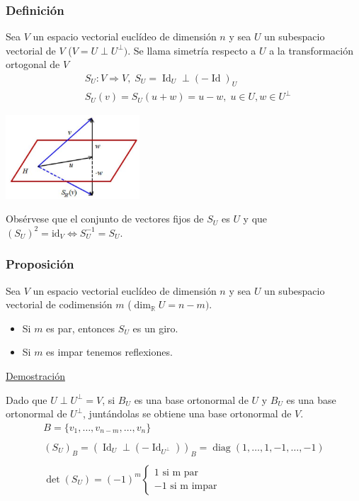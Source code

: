 \documentclass[12pt, a4paper, ones, notitlepage, openany,titlepage]{article}
\begin{document}
\subsubsection{Definición}
Sea $V$ un espacio vectorial euclídeo de dimensión $n$ y sea $U$ un subespacio vectorial de $V$ ($V = U \perp U^\perp)$. Se llama simetría respecto a $U$ a la transformación ortogonal de $V$
$$
\begin{aligned}
	& S_U : V \Longrightarrow V, \; S_U = \operatorname{Id}_U \perp(-\operatorname{Id})_U \\
	& S_U(v) = S_U(u + w) = u - w, \; u \in U, w \in U^\perp
\end{aligned}
$$
\begin{center}
	\includegraphics[max width=5cm]{2023_03_20_c2fe6c117849a1a0e8afg-053}
\end{center}
Obsérvese que el conjunto de vectores fijos de $S_{U}$ es $U$ y que $\left(S_{U}\right)^{2}=\mathrm{id}_{V} \Longleftrightarrow S_{U}^{-1}=S_{U}$.

\subsubsection{Proposición}
Sea $V$ un espacio vectorial euclídeo de dimensión $n$ y sea $U$ un subespacio vectorial de codimensión $m$ ($\operatorname{dim}_\mathbb{R}U = n - m)$.
\begin{itemize}
	\item Si $m$ es par, entonces $S_U$ es un giro.
	\item Si $m$ es impar tenemos reflexiones.
\end{itemize}

\noindent\underline{Demostración}

Dado que $U \perp U^\perp = V$, si $B_U$ es una base ortonormal de $U$ y $B_U$ es una base ortonormal de $U^\perp$, juntándolas se obtiene una base ortonormal de $V$.
\begin{gather*}
	B = \{v_1,\ldots,v_{n-m},\ldots,v_n\} \\\\
	(S_U)_B = (\operatorname{Id}_U \perp (-\operatorname{Id}_{U^\perp}))_B = \operatorname{diag}(1, \ldots, 1, -1, \ldots, -1) \\\\
	\operatorname{det}(S_U) = (-1)^m
	\begin{cases*}
		1 \text{ si m par} \\
		-1 \text{ si m impar}
	\end{cases*}
\end{gather*}
\end{document}
